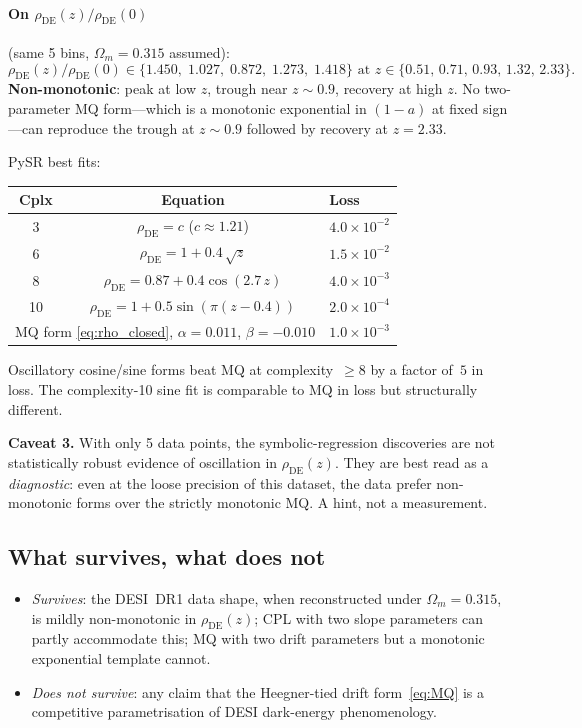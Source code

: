 \documentclass[11pt,letterpaper,twoside]{article}
\newcommand{\Om}{\Omega_{m}}
\newcommand{\rDE}{\rho_{\mathrm{DE}}}
\begin{document}
\paragraph{On $\rDE(z)/\rDE(0)$} (same 5 bins, $\Om=0.315$ assumed):
\begin{equation}
  \rDE(z)/\rDE(0)\in
  \{1.450,\;1.027,\;0.872,\;1.273,\;1.418\}
  \text{ at }
  z\in\{0.51,\,0.71,\,0.93,\,1.32,\,2.33\}.
\end{equation}
\textbf{Non-monotonic}: peak at low $z$, trough near $z\sim 0.9$, recovery at
high $z$. No two-parameter MQ form---which is a monotonic exponential in
$(1-a)$ at fixed sign---can reproduce the trough at $z\sim 0.9$ followed by
recovery at $z=2.33$.

PySR best fits:
\begin{center}\small
\begin{tabular}{ccl}
\toprule
Cplx & Equation                                          & Loss \\
\midrule
3  & $\rDE=c$ ($c\approx1.21$)                            & $4.0\times10^{-2}$ \\
6  & $\rDE=1+0.4\,\sqrt{z}$                               & $1.5\times10^{-2}$ \\
8  & $\rDE=0.87+0.4\cos(2.7\,z)$                          & $4.0\times10^{-3}$ \\
10 & $\rDE=1+0.5\sin(\pi(z-0.4))$                         & $2.0\times10^{-4}$ \\
\midrule
\multicolumn{2}{l}{MQ form \eqref{eq:rho_closed}, $\alpha=0.011$, $\beta=-0.010$}
                                                          & $1.0\times10^{-3}$ \\
\bottomrule
\end{tabular}
\end{center}
Oscillatory cosine/sine forms beat MQ at complexity~$\geq 8$ by a factor of~$5$
in loss. The complexity-10 sine fit is comparable to MQ in loss but
structurally different.

\textbf{Caveat 3.} With only 5 data points, the symbolic-regression
discoveries are not statistically robust evidence of oscillation in
$\rDE(z)$. They are best read as a \emph{diagnostic}: even at the loose
precision of this dataset, the data prefer non-monotonic forms over the
strictly monotonic MQ. A hint, not a measurement.

\subsection{What survives, what does not}
\begin{itemize}[leftmargin=*,topsep=0.1em,itemsep=0.1em]
\item \emph{Survives}: the DESI~DR1 data shape, when reconstructed under
      $\Om=0.315$, is mildly non-monotonic in $\rDE(z)$; CPL with two slope
      parameters can partly accommodate this; MQ with two drift parameters
      but a monotonic exponential template cannot.
\item \emph{Does not survive}: any claim that the Heegner-tied drift
      form~\eqref{eq:MQ} is a competitive parametrisation of DESI dark-energy
      phenomenology.
\end{itemize}
\end{document}
